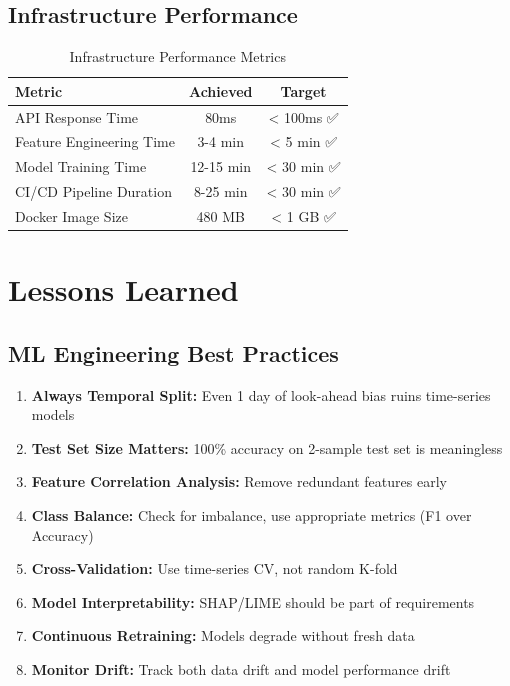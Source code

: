 \subsection{Infrastructure Performance}

\begin{table}[H]
\centering
\caption{Infrastructure Performance Metrics}
\begin{tabularx}{\textwidth}{lcc}
\toprule
\textbf{Metric} & \textbf{Achieved} & \textbf{Target} \\
\midrule
API Response Time & 80ms & < 100ms ✅ \\
Feature Engineering Time & 3-4 min & < 5 min ✅ \\
Model Training Time & 12-15 min & < 30 min ✅ \\
CI/CD Pipeline Duration & 8-25 min & < 30 min ✅ \\
Docker Image Size & 480 MB & < 1 GB ✅ \\
\bottomrule
\end{tabularx}
\end{table}

\section{Lessons Learned}

\subsection{ML Engineering Best Practices}

\begin{enumerate}
    \item \textbf{Always Temporal Split:} Even 1 day of look-ahead bias ruins time-series models
    \item \textbf{Test Set Size Matters:} 100\% accuracy on 2-sample test set is meaningless
    \item \textbf{Feature Correlation Analysis:} Remove redundant features early
    \item \textbf{Class Balance:} Check for imbalance, use appropriate metrics (F1 over Accuracy)
    \item \textbf{Cross-Validation:} Use time-series CV, not random K-fold
    \item \textbf{Model Interpretability:} SHAP/LIME should be part of requirements
    \item \textbf{Continuous Retraining:} Models degrade without fresh data
    \item \textbf{Monitor Drift:} Track both data drift and model performance drift
\end{enumerate}

